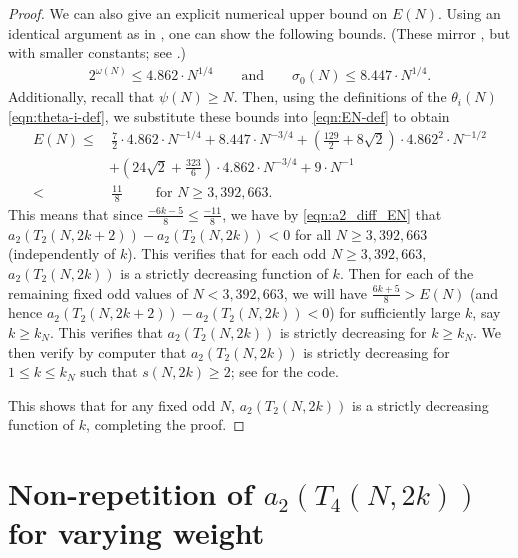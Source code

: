 \documentclass[11pt,letterpaper,reqno]{amsart}
\numberwithin{figure}{section}
\numberwithin{table}{section}
\theoremstyle{definition}
\theoremstyle{plain}
\newcommand{\lrp}[1]{\left(#1\right)}
\theoremstyle{definition}
\theoremstyle{definition}
\theoremstyle{remark}
\numberwithin{equation}{section}
\begin{document}
\begin{proof}
We can also give an explicit numerical upper bound on $E(N)$. Using an identical argument as in \cite[Lemma 2.4]{ross}, one can show the following bounds. (These mirror \cite[Lemma 4.2]{previousPaper}, but with smaller constants; see \cite{ross-code}.)
\begin{align}
    2^{\omega(N)} \leq 4.862 \cdot N^{1/4}  \qquad \text{and} \qquad \sigma_0(N) \leq 8.447 \cdot N^{1/4}. \label{eqn:temp-mult-bounds}
\end{align} 
Additionally, recall that $\psi(N) \geq N$.
Then, using the definitions of the $\theta_i(N)$ \eqref{eqn:theta-i-def}, we substitute these bounds into \eqref{eqn:EN-def} to obtain
\begin{align} 
    E(N) \leq&\, 
    \frac72 \cdot 4.862 \cdot N^{-1/4} 
    + 8.447 \cdot N^{-3/4} 
    + \lrp{\frac{129}{2} + 8\sqrt{2}} \cdot 4.862^2 \cdot N^{-1/2} \\
    &
    + \lrp{24\sqrt{2} + \frac{323}{6} } \cdot 4.862 \cdot N^{-3/4} 
    + 9 \cdot N^{-1} \\
    <&\, \frac{11}{8} \qquad \text{ for } N \geq 3,\!392,\!663.
\end{align}
This means that since $\frac{-6k-5}{8} \leq \frac{-11}{8}$, we have by \eqref{eqn:a2_diff_EN} that $a_2(T_2(N, 2k + 2)) - a_2(T_2(N, 2k)) < 0$ for all $N \geq 3,\!392,\!663$ (independently of $k$). This verifies that for each odd $N \geq 3,\!392,\!663$, $a_2(T_2(N, 2k))$ is a strictly decreasing function of $k$.
Then for each of the remaining fixed odd values of $N < 3,\!392,\!663$, we will have $\frac{6k+5}{8} > E(N)$ (and hence $a_2(T_2(N, 2k + 2)) - a_2(T_2(N, 2k)) < 0$) for sufficiently large $k$, say $k \geq k_N$. This verifies that $a_2(T_2(N, 2k))$ is strictly decreasing for $k \geq k_N$.
We then verify by computer that $a_2(T_2(N, 2k))$ is strictly decreasing for  $1 \le k \le k_N$ such that $s(N,2k)\ge 2$; see \cite{ross-code} for the code. 

This shows that for any fixed odd $N$, $a_2(T_2(N, 2k))$ is a strictly decreasing function of $k$,  completing the proof.
\end{proof}



\section{Non-repetition of \texorpdfstring{$a_2(T_4(N,2k))$}{a2(T4(N,2k))} for varying weight}\label{sect:T4nonrepetition}
\end{document}
